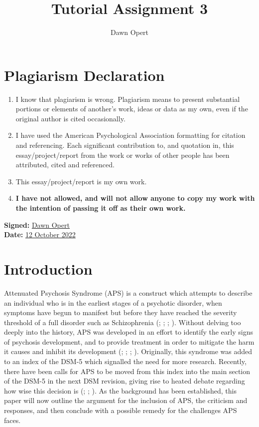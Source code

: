 \documentclass[stu,a4paper,12pt,donotrepeattitle]{apa7}
\title{Tutorial Assignment 3}
\author{Dawn Opert}
\affiliation{OPRNET001}
\begin{document}
\maketitle
\section{Plagiarism Declaration}
\begin{enumerate}
    \item I know that plagiarism is wrong. Plagiarism means to present
        substantial portions or elements of another’s work, ideas or data
        as my own, even if the original author is cited occasionally.
    \item I have used the American Psychological Association formatting for
        citation and referencing. Each significant contribution to, and
        quotation in, this essay/project/report from the work or works of other
        people has been attributed, cited and referenced.
    \item This essay/project/report is my own work.
    \item \textbf{I have not allowed, and will not allow anyone to copy my work
        with the intention of passing it off as their own work.}
\end{enumerate}

\textbf{Signed:} \underline{Dawn Opert}\\
\textbf{Date:} \underline{12 October 2022}
\newpage
\section{Introduction}
Attenuated Psychosis Syndrome (APS) is a construct which attempts to describe
an individual who is in the earliest stages of a psychotic disorder, when
symptoms have begun to manifest but before they have reached the severity
threshold of a full disorder such as Schizophrenia (\cite{apa13};
\cite{corcetal21}; \cite{mahbell19b}; \cite{zachetal20}). Without delving too
deeply into the history, APS was developed in an effort to identify the early
signs of psychosis development, and to provide treatment in order to mitigate
the harm it causes and inhibit its development (\cite{carp20}; \cite{corcetal21};
\cite{mahbell19b}; \cite{zachetal20}). Originally, this syndrome was added to an
index of the DSM-5 which signalled the need for more research. Recently, there
have been calls for APS to be moved from this index into the main section of
the DSM-5 in the next DSM revision, giving rise to heated debate regarding how
wise this decision is (\cite{carp20}; \cite{corcetal21}; \cite{mahbell19b}). As
the background has been established, this paper will now outline the argument
for the inclusion of APS, the criticism and responses, and then conclude with
a possible remedy for the challenges APS faces.
\end{document}
